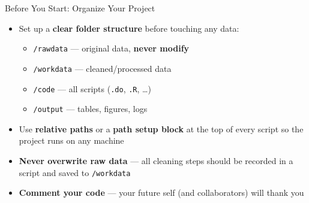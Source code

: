 \documentclass[dvipsnames,hyperref={pdfpagelabels=false}]{beamer}
\begin{document}
\begin{frame}{Before You Start: Organize Your Project}{}
\begin{itemize}
    \item Set up a \textbf{clear folder structure} before touching any data:
    \vspace{0.15cm}
    \begin{itemize}
        \item \texttt{/rawdata} --- original data, \textbf{never modify}
        \vspace{0.1cm}
        \item \texttt{/workdata} --- cleaned/processed data
        \vspace{0.1cm}
        \item \texttt{/code} --- all scripts (\texttt{.do}, \texttt{.R}, \ldots)
        \vspace{0.1cm}
        \item \texttt{/output} --- tables, figures, logs
    \end{itemize}
    \vspace{0.2cm}
    \item Use \textbf{relative paths} or a \textbf{path setup block}
    at the top of every script so the project runs on any machine
    \vspace{0.2cm}
    \item \textbf{Never overwrite raw data} --- all cleaning steps should
    be recorded in a script and saved to \texttt{/workdata}
    \vspace{0.2cm}
    \item \textbf{Comment your code} --- your future self (and collaborators)
    will thank you
    \vspace{0.2cm}
\end{itemize}
\end{frame}
\end{document}
